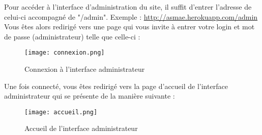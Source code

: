 Pour accéder à l’interface d’administration du site, il suffit d’entrer l’adresse de celui-ci accompagné de "/admin". Exemple : \href{http://asmae.herokuapp.com/admin}{http://asmae.herokuapp.com/admin}\\
Vous êtes alors redirigé vers une page qui vous invite à entrer votre login et mot de passe (administrateur) telle que celle-ci :

\begin{figure}
\centering
\texttt{[image: connexion.png]}
\caption{Connexion à l'interface administrateur}
\end{figure}

Une fois connecté, vous êtes redirigé vers la page d'accueil de l'interface administrateur qui se présente de la manière suivante :

\begin{figure}
\centering
\texttt{[image: accueil.png]}
\caption{Accueil de l'interface administrateur}
\end{figure}

